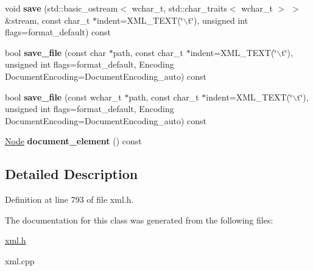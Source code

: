 \begin{DoxyCompactItemize}
\item 
\hypertarget{classphys_1_1xml_1_1Document_a8bdba6317f7ba369c3c83f2e3f77829a}{
void {\bfseries save} (std::basic\_\-ostream$<$ wchar\_\-t, std::char\_\-traits$<$ wchar\_\-t $>$ $>$ \&stream, const char\_\-t $\ast$indent=XML\_\-TEXT(\char`\"{}$\backslash$t\char`\"{}), unsigned int flags=format\_\-default) const }
\label{dd/d44/classphys_1_1xml_1_1Document_a8bdba6317f7ba369c3c83f2e3f77829a}

\item 
\hypertarget{classphys_1_1xml_1_1Document_a525eaef8d0b6bc9c50135326c105ca08}{
bool {\bfseries save\_\-file} (const char $\ast$path, const char\_\-t $\ast$indent=XML\_\-TEXT(\char`\"{}$\backslash$t\char`\"{}), unsigned int flags=format\_\-default, Encoding DocumentEncoding=DocumentEncoding\_\-auto) const }
\label{dd/d44/classphys_1_1xml_1_1Document_a525eaef8d0b6bc9c50135326c105ca08}

\item 
\hypertarget{classphys_1_1xml_1_1Document_ac96152a05caafbbdd432775574b94510}{
bool {\bfseries save\_\-file} (const wchar\_\-t $\ast$path, const char\_\-t $\ast$indent=XML\_\-TEXT(\char`\"{}$\backslash$t\char`\"{}), unsigned int flags=format\_\-default, Encoding DocumentEncoding=DocumentEncoding\_\-auto) const }
\label{dd/d44/classphys_1_1xml_1_1Document_ac96152a05caafbbdd432775574b94510}

\item 
\hypertarget{classphys_1_1xml_1_1Document_a481cbf277cfe6d6daf1b66f8d862b88e}{
\hyperlink{classphys_1_1xml_1_1Node}{Node} {\bfseries document\_\-element} () const }
\label{dd/d44/classphys_1_1xml_1_1Document_a481cbf277cfe6d6daf1b66f8d862b88e}

\end{DoxyCompactItemize}


\subsection{Detailed Description}


Definition at line 793 of file xml.h.



The documentation for this class was generated from the following files:\begin{DoxyCompactItemize}
\item 
\hyperlink{xml_8h}{xml.h}\item 
xml.cpp\end{DoxyCompactItemize}
